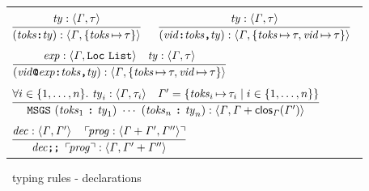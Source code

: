 \documentclass[final]{article}
\begin{document}
\begin{figure}[t]
\begin{small}
\begin{center}
\begin{tabular}{llll}
    \\
    &&&
    \\

    \multicolumn{2}{l}{
      $\MEMinferb
      {\MEMtyping
        {\CONSheadert{\METAatoms}{\METAty}}
        {\METAityenv}
        {\{\asgn{\METAatoms}{\METAity}\}}
      }
      {\MEMtyping{\METAty}{\METAityenv}{\METAity}}$
    }

    &

    \multicolumn{2}{l}{
      $\MEMinferb
      {\MEMtyping
        {\CONSheaderc{\METAvid}{\METAatoms}{\METAty}}
        {\METAityenv}
        {\{\asgn{\METAatoms}{\METAity},\asgn{\METAvid}{\METAity}\}}
      }
      {\MEMtyping{\METAty}{\METAityenv}{\METAity}}$
    }

    \\
    &&&
    \\

    \multicolumn{4}{l}{
      $\MEMinferc
      {\MEMtyping
        {\CONSheaderl{\METAvid}{\METAexp}{\METAatoms}{\METAty}}
        {\METAityenv}
        {\{\asgn{\METAatoms}{\METAity},\asgn{\METAvid}{\METAity}\}}
      }
      {\MEMtyping{\METAexp}{\METAityenv}{\CONSconsty{\CONSlocty}{\CONSlistty}}}
      {\MEMtyping{\METAty}{\METAityenv}{\METAity}}$
    }

    \\
    &&&
    \\

    \multicolumn{4}{l}{
      $\MEMinferc
      {\MEMtyping
        {\CONSmsgsdecn{\CONStypedatoms{\METAatoms_1}{\METAty_1}}{\CONStypedatoms{\METAatoms_n}{\METAty_n}}}
        {\METAityenv}
        {\MEMplusenv{\METAityenv}{\MEMclos{\METAityenv}{\METAityenv'}}}
      }
      {\forallexp{i\in\{1,\dots,n\}}{\MEMtyping{\METAty_i}{\METAityenv}{\METAity_i}}}
      {\METAityenv'=\{\asgn{\METAatoms_i}{\METAity_i}\mid{i}\in\{1,\dots,n\}\}}$
    }

    \\
    &&&
    \\

    \multicolumn{4}{l}{
      $\MEMinferc
      {\MEMtyping
        {\CONSprog{\CONSdec{\METAdec}}{\METAprog}}
        {\METAityenv}
        {\MEMplusenv{\METAityenv'}{\METAityenv''}}
      }
      {\MEMtyping{\METAdec}{\METAityenv}{\METAityenv'}}
      {\CONSop{\MEMtyping{\METAprog}{\MEMplusenv{\METAityenv}{\METAityenv'}}{\METAityenv''}}}$
    }
  \end{tabular}
\end{center}
\caption{\eml\ typing rules - declarations}
\label{fig:typing-rules-declarations}
\end{small}
\end{figure}
\end{document}
